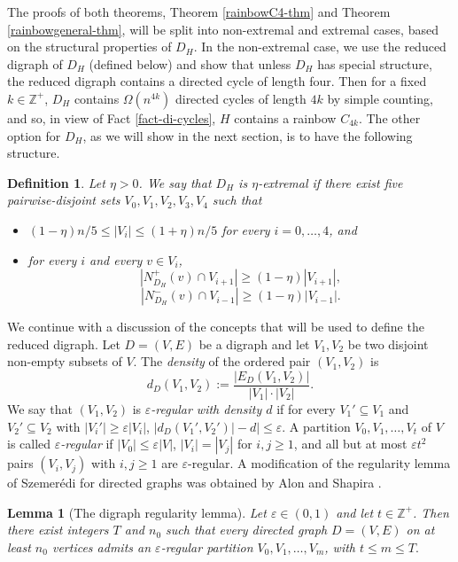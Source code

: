 \documentclass{article}
\newtheorem{defn}[theorem]{Definition}
\newtheorem{lemma}[theorem]{Lemma}
\renewcommand{\epsilon}{{\varepsilon}}
\begin{document}
The proofs of both theorems, Theorem \ref{rainbowC4-thm} and Theorem \ref{rainbowgeneral-thm}, will be split into non-extremal and extremal cases, based on the structural properties of $D_H$. In the non-extremal case, we use the reduced digraph of $D_H$ (defined below) and show that unless $D_H$ has special structure, the reduced digraph contains a directed cycle of length four. Then for a fixed $k\in \mathbb{Z}^+$, $D_H$ contains $\Omega(n^{4k})$ directed cycles of length $4k$ by simple counting, and so, in view of Fact \ref{fact-di-cycles}, $H$ contains a rainbow $C_{4k}$. The other option for $D_H$, as we will show in the next section, is to have the following structure. 
\begin{defn}\label{ext-def}Let $\eta>0$. 
We say that $D_H$ is $\eta$-extremal if there exist five pairwise-disjoint sets $V_0, V_1, V_2, V_3, V_4$ such that 
\begin{itemize}
\item $(1-\eta)n/5\leq |V_i|\leq (1+\eta)n/5$ for every $i=0, \dots, 4$, and
\item for every $i$ and every $v\in V_i$,
$$|N^+_{D_H}(v) \cap V_{i+1}|\geq (1-\eta)|V_{i+1}|,$$
$$|N^-_{D_H}(v) \cap V_{i-1}|\geq (1-\eta)|V_{i-1}|.$$
\end{itemize}
 \end{defn}
We continue with a discussion of the concepts that will be used to define the reduced digraph.
Let $D=(V,E)$ be a digraph and let $V_1, V_2$ be two disjoint non-empty subsets of $V$. The {\it density} of the ordered pair $(V_1,V_2)$ is 
\[d_D(V_1,V_2):=\frac{|E_D(V_1, V_2)|}{|V_1|\cdot |V_2|}.\]
We say that $(V_1,V_2)$ 
is \textit{$\epsilon$-regular with density $d$} if for every $V_1'\subseteq V_1$ and $V_2'\subseteq V_2$ with $|V_i'|\geq \epsilon |V_i|$, 
$|d_{D}(V_1', V_2')|-d|\leq \epsilon.$
A partition $V_0, V_1, \dots, V_t$ of $V$ is called \textit{$\epsilon$-regular} if $|V_0|\leq \epsilon |V|$, $|V_i|=|V_j|$ for $i,j\geq 1$, and all but at most $\epsilon t^2$ pairs $(V_i, V_j)$ with $i, j\geq 1$ are $\epsilon$-regular. 
A modification of the regularity lemma of Szemer\'{e}di \cite{szem} for directed graphs was obtained by Alon and Shapira \cite{alon-shapira}. 
\begin{lemma}[The digraph regularity lemma]\label{reg-lemma}
    Let $\epsilon \in (0,1)$ and let $t\in \mathbb{Z}^+$. Then there exist integers $T$ and $n_0$ such that every directed  graph $D=(V, E)$ on at least  $n_0$ vertices admits an $\epsilon$-regular partition $V_0, V_1,\dots, V_m$, with $t \leq m\leq T.$
\end{lemma}
\end{document}
